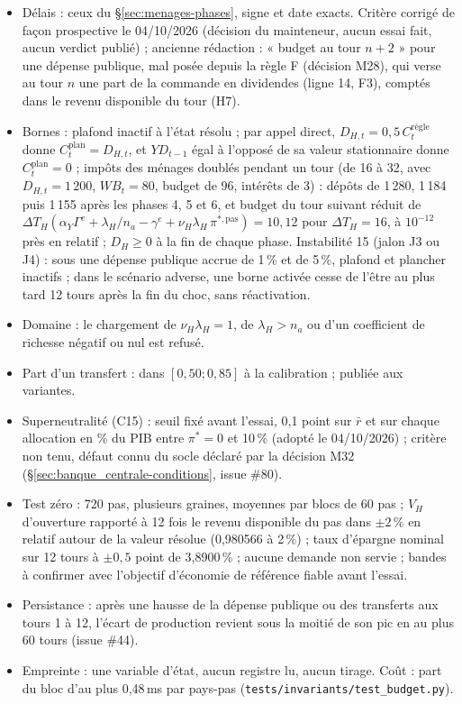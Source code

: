 \documentclass[11pt,a4paper]{article}
\begin{document}
\begin{proposee}
\begin{itemize}
\item Délais : ceux du \S\ref{sec:menages-phases}, signe et date exacts. Critère corrigé de façon prospective le 04/10/2026 (décision du mainteneur, aucun essai fait, aucun verdict publié) ; ancienne rédaction : « budget au tour $n + 2$ » pour une dépense publique, mal posée depuis la règle F (décision M28), qui verse au tour $n$ une part de la commande en dividendes (ligne 14, F3), comptés dans le revenu disponible du tour (H7).
\item Bornes : plafond inactif à l'état résolu ; par appel direct, $D_{H,t} = 0{,}5\,C^{\text{règle}}_t$ donne $C^{\mathrm{plan}}_t = D_{H,t}$, et $\mathit{YD}_{t-1}$ égal à l'opposé de sa valeur stationnaire donne $C^{\mathrm{plan}}_t = 0$ ; impôts des ménages doublés pendant un tour (de 16 à 32, avec $D_{H,t} = 1\,200$, $\mathit{WB}_t = 80$, budget de 96, intérêts de 3) : dépôts de 1\,280, 1\,184 puis 1\,155 après les phases 4, 5 et 6, et budget du tour suivant réduit de $\Delta T_H(\alpha_Y\Gamma^e + \lambda_H/n_a - \gamma^e + \nu_H\lambda_H\,\pi^{\ast,\mathrm{pas}}) = 10{,}12$ pour $\Delta T_H = 16$, à $10^{-12}$ près en relatif ; $D_H \ge 0$ à la fin de chaque phase. Instabilité 15 (jalon J3 ou J4) : sous une dépense publique accrue de 1\,\% et de 5\,\%, plafond et plancher inactifs ; dans le scénario adverse, une borne activée cesse de l'être au plus tard 12 tours après la fin du choc, sans réactivation.
\item Domaine : le chargement de $\nu_H\lambda_H = 1$, de $\lambda_H > n_a$ ou d'un coefficient de richesse négatif ou nul est refusé.
\item Part d'un transfert : dans $[0{,}50 ; 0{,}85]$ à la calibration ; publiée aux variantes.
\item Superneutralité (C15) : seuil fixé avant l'essai, 0,1 point sur $\bar r$ et sur chaque allocation en \% du PIB entre $\pi^\ast = 0$ et 10\,\% (adopté le 04/10/2026) ; critère non tenu, défaut connu du socle déclaré par la décision M32 (\S\ref{sec:banque_centrale-conditions}, issue \#80).
\item Test zéro : 720 pas, plusieurs graines, moyennes par blocs de 60 pas ; $V_H$ d'ouverture rapporté à 12 fois le revenu disponible du pas dans $\pm 2\,\%$ en relatif autour de la valeur résolue (0,980566 à 2\,\%) ; taux d'épargne nominal sur 12 tours à $\pm 0{,}5$ point de 3,8900\,\% ; aucune demande non servie ; bandes à confirmer avec l'objectif d'économie de référence fiable avant l'essai.
\item Persistance : après une hausse de la dépense publique ou des transferts aux tours 1 à 12, l'écart de production revient sous la moitié de son pic en au plus 60 tours (issue \#44).
\item Empreinte : une variable d'état, aucun registre lu, aucun tirage. Coût : part du bloc d'au plus 0,48\,ms par pays-pas (\nolinkurl{tests/invariants/test_budget.py}).
\end{itemize}


\end{proposee}
\end{document}
